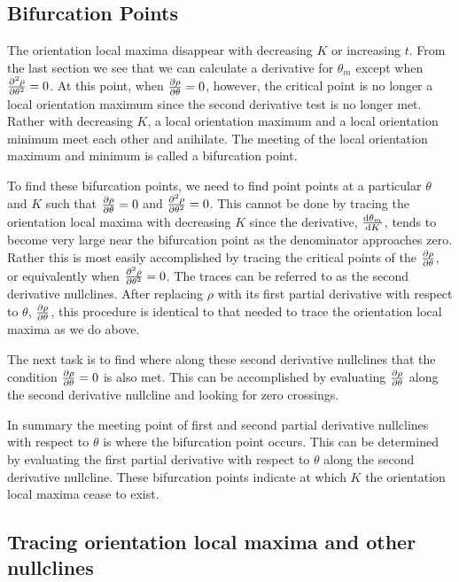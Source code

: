 \documentclass[11pt]{article} %
\begin{document}
\subsection{Bifurcation Points}

The orientation local maxima disappear with decreasing $ K $ or increasing $ t $. From the last section we see that we can calculate a derivative for $ \theta_m $ except when $ \pdv[2]{\rho}{\theta}  = 0 $. At this point, when $ \pdv{\rho}{\theta} = 0 $, however, the critical point is no longer a local orientation maximum since the second derivative test is no longer met. Rather with decreasing $ K $, a local orientation maximum and a local orientation minimum meet each other and anihilate. The meeting of the local orientation maximum and minimum is called a bifurcation point.

To find these bifurcation points, we need to find point points at a particular $ \theta $ and $ K $ such that $ \pdv{\rho}{\theta} = 0 $ and $ \pdv[2]{\rho}{\theta} = 0 $. This cannot be done by tracing the orientation local maxima with decreasing $ K $ since the derivative, $ \dv{\theta_m}{K} $, tends to become very large near the bifurcation point as the denominator approaches zero. Rather this is most easily accomplished by tracing the critical points of the $ \pdv{\rho}{\theta} $, or equivalently when $ \pdv[2]{\rho}{\theta} = 0 $. The traces can be referred to as the second derivative nullclines. After replacing $ \rho $ with its first partial derivative with respect to $ \theta $, $ \pdv{\rho}{\theta} $, this procedure is identical to that needed to trace the orientation local maxima as we do above.

The next task is to find where along these second derivative nullclines that the condition $ \pdv{\rho}{\theta} = 0 $ is also met. This can be accomplished by evaluating $ \pdv{\rho}{\theta} $ along the second derivative nullcline and looking for zero crossings.

In summary the meeting point of first and second partial derivative nullclines with respect to $ \theta $ is where the bifurcation point occurs. This can be determined by evaluating the first partial derivative with respect to $ \theta $ along the second derivative nullcline. These bifurcation points indicate at which $ K $ the orientation local maxima cease to exist.

\subsection{Tracing orientation local maxima and other nullclines}
\end{document}
